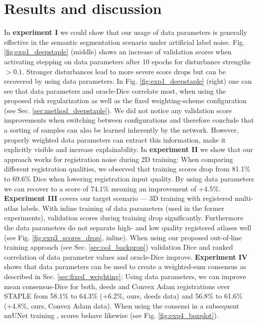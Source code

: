 \section{Results and discussion}
    \label{sec:results}
    In \textbf{experiment I} we could show that our usage of data parameters is generally effective in the semantic segmentation scenario under artificial label noise.
    Fig. \ref{fig:exp1_deepstaple} (middle) shows an increase of validation scores when activating stepping on data parameters after 10 epochs for disturbance strengths \(>0.1\). Stronger disturbances lead to more severe score drops but can be recovered by using data parameters.
    In Fig. \ref{fig:exp1_deepstaple} (right) one can see that data parameters and oracle-Dice correlate most, when using the proposed risk regularization as well as the fixed weighting-scheme configuration (see Sec. \ref{sec:method_deepstaple}). We did not notice any validation score improvements when switching between configurations and therefore conclude that a sorting of samples can also be learned inherently by the network. However, properly weighted data parameters can extract this information, make it explicitly visible and increase explainability.
    In \textbf{experiment II} we show that our approach works for registration noise during 2D training: When comparing different registration qualities, we observed that training scores drop from 81.1\% to 69.6\% Dice when lowering registration input quality. By using data parameters we can recover to a score of 74.1\% meaning an improvement of +4.5\%.
    \textbf{Experiment III} covers our target scenario --- 3D training with registered multi-atlas labels. With inline training of data parameters (used in the former experiments), validation scores during training drop significantly. Furthermore the data parameters do not separate high- and low quality registered atlases well (see Fig. \ref{fig:exp3_scores_drop}, inline). When using our proposed out-of-line training approach (see Sec. \ref{sec:ool_backprop}) validation Dice and ranked correlation of data parameter values and oracle-Dice improve.
    \textbf{Experiment IV} shows that data parameters can be used to create a weighted-sum consensus as described in Sec. \ref{sec:fixed_weighting}: Using data parameters, we can improve mean consensus-Dice for both, deeds and Convex Adam registrations over STAPLE \cite{warfield2004simultaneous} from 58.1\% to 64.3\% (+6.2\%, ours, deeds data) and 56.8\% to 61.6\% (+4.8\%, ours, Convex Adam data).
    When using the consensi in a subsequent nnUNet training \cite{isensee2021nnu}, scores behave likewise (see Fig. \ref{fig:exp4_boxplot}).
